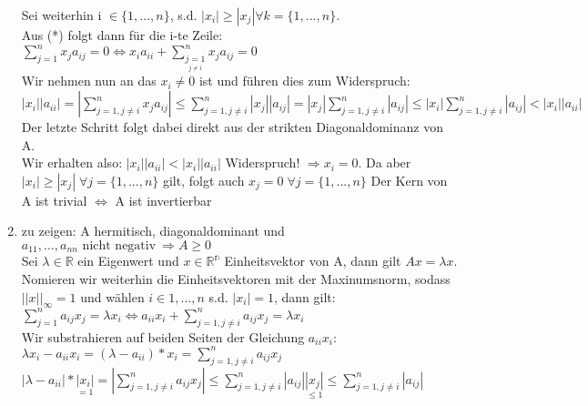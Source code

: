 \documentclass[ngerman]{article}
\begin{document}
\begin{enumerate}
Sei weiterhin i $\in \{1,...,n\}$, s.d. $|x_i| \ge |x_j|\forall k=\{1,...,n\}$.\\
\newline
Aus (*) folgt dann für die i-te Zeile: $\sum_{j=1}^n x_j a_{ij} = 0 \Leftrightarrow x_i a_{ii}+\sum_{\underset{j\neq i}{j=1}}^n x_j a_{ij} = 0 $\\
\newline
Wir nehmen nun an das $x_i \neq 0$ ist und führen dies zum Widerspruch:\\
\newline
$|x_i||a_{ii}| = |\sum_{j=1, j\neq i}^n x_j a_{ij}| \le \sum_{j=1, j\neq i}^n |x_j| |a_{ij}| = |x_j| \sum_{j=1, j\neq i}^n |a_{ij}| \le |x_i| \sum_{j=1, j\neq i}^n |a_{ij}| < |x_i| |a_{ii}|$\\
\newline
Der letzte Schritt folgt dabei direkt aus der strikten Diagonaldominanz von A.\\
Wir erhalten also: $|x_i| |a_{ii}|< |x_i| |a_{ii}|$ Widerspruch! $\Rightarrow x_i = 0$.\newline
Da aber $|x_i| \ge |x_j|\;\forall j=\{1,...,n\}$ gilt, folgt auch $x_j=0\;\forall j=\{1,...,n\}$\newline
Der Kern von A ist trivial $\Leftrightarrow$ A ist invertierbar
\newline
\item zu zeigen: A hermitisch, diagonaldominant und $a_{11},...,a_{nn} \text{ nicht negativ}\ \Rightarrow A \ge 0$\\
\newline
Sei $\lambda \in \mathbb{R}$ ein Eigenwert und $ x \in \mathbb{R^\text{n}}$ Einheitsvektor von A, dann gilt $Ax = \lambda x$. Nomieren wir weiterhin die Einheitsvektoren mit der Maxinumsnorm, sodass $||x||_\infty = 1$ und wählen $ i \in {1,...,n}$ s.d. $|x_i|=1$, dann gilt:\\
\newline
$\sum_{j=1}^n a_{ij}x_j = \lambda x_i \Leftrightarrow a_{ii}x_i + \sum_{j=1, j\neq i}^n a_{ij}x_j = \lambda x_i $ \\
\newline
Wir substrahieren auf beiden Seiten der Gleichung $a_{ii} x_i$:\\
$\lambda x_i - a_{ii} x_i = (\lambda - a_{ii})* x_i = \sum_{j=1, j\neq i}^n a_{ij}x_j $\\
$|\lambda - a_{ii}|* \underset{=1}{|x_i|} = |\sum_{j=1, j\neq i}^n a_{ij}x_j| \le \sum_{j=1, j\neq i}^n |a_{ij}|\underset{\le1}{|x_j|} \le \sum_{j=1, j\neq i}^n |a_{ij}| $\\

\end{enumerate}
\end{document}
